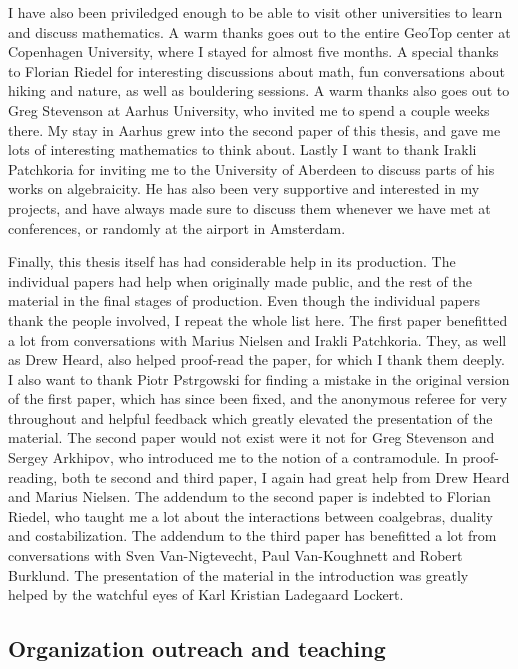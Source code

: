 I have also been priviledged enough to be able to visit other universities to learn and discuss mathematics. A warm thanks goes out to the entire GeoTop center at Copenhagen University, where I stayed for almost five months. A special thanks to Florian Riedel for interesting discussions about math, fun conversations about hiking and nature, as well as bouldering sessions. A warm thanks also goes out to Greg Stevenson at Aarhus University, who invited me to spend a couple weeks there. My stay in Aarhus grew into the second paper of this thesis, and gave me lots of interesting mathematics to think about. Lastly I want to thank Irakli Patchkoria for inviting me to the University of Aberdeen to discuss parts of his works on algebraicity. He has also been very supportive and interested in my projects, and have always made sure to discuss them whenever we have met at conferences, or randomly at the airport in Amsterdam. 

Finally, this thesis itself has had considerable help in its production. The individual papers had help when originally made public, and the rest of the material in the final stages of production. Even though the individual papers thank the people involved, I repeat the whole list here. The first paper benefitted a lot from conversations with Marius Nielsen and Irakli Patchkoria. They, as well as Drew Heard, also helped proof-read the paper, for which I thank them deeply. I also want to thank Piotr Pstr\a{}gowski for finding a mistake in the original version of the first paper, which has since been fixed, and the anonymous referee for very throughout and helpful feedback which greatly elevated the presentation of the material. The second paper would not exist were it not for Greg Stevenson and Sergey Arkhipov, who introduced me to the notion of a contramodule. In proof-reading, both te second and third paper, I again had great help from Drew Heard and Marius Nielsen. The addendum to the second paper is indebted to Florian Riedel, who taught me a lot about the interactions between coalgebras, duality and costabilization. The addendum to the third paper has benefitted a lot from conversations with Sven Van-Nigtevecht, Paul Van-Koughnett and Robert Burklund. The presentation of the material in the introduction was greatly helped by the watchful eyes of Karl Kristian Ladegaard Lockert. 


\subsection*{Organization outreach and teaching}

